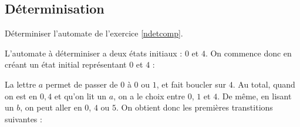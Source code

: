 \subsection{Déterminisation}
\label{det}

\begin{exercice}
Déterminiser l'automate de l'exercice \ref{ndetcomp}.
\end{exercice}

\begin{correction*}

L'automate à déterminiser a deux états initiaux : $0$ et $4$. On commence donc en créant un état initial représentant $0$ et $4$ :


\begin{figure}[!ht]
\centering
{}
\end{figure}

La lettre $a$ permet de passer de $0$ à $0$ ou $1$, et fait boucler sur $4$. Au total, quand on est en $0,4$ et qu'on lit un $a$, on a le choix entre $0$, $1$ et $4$. De même, en lisant un $b$, on peut aller en $0$, $4$ ou $5$. On obtient donc les premières transtitions suivantes :



\begin{figure}[!ht]
\centering
{}
\end{figure}


\end{correction*}
